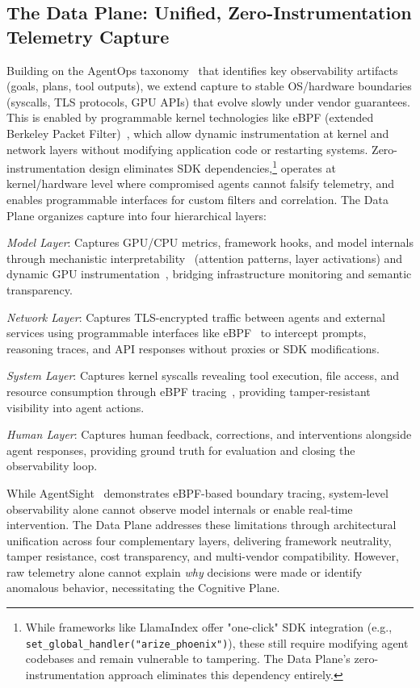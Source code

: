 \documentclass[sigplan,screen,9pt]{acmart}
\begin{document}
\subsection{The Data Plane: Unified, Zero-Instrumentation Telemetry Capture}

Building on the AgentOps taxonomy~\cite{Dong2024AgentOps} that identifies key observability artifacts (goals, plans, tool outputs), we extend capture to stable OS/hardware boundaries (syscalls, TLS protocols, GPU APIs) that evolve slowly under vendor guarantees. This is enabled by programmable kernel technologies like eBPF (extended Berkeley Packet Filter)~\cite{brendangregg,ebpfio}, which allow dynamic instrumentation at kernel and network layers without modifying application code or restarting systems. Zero-instrumentation design eliminates SDK dependencies,\footnote{While frameworks like LlamaIndex offer "one-click" SDK integration (e.g., \texttt{set\_global\_handler("arize\_phoenix")}), these still require modifying agent codebases and remain vulnerable to tampering. The Data Plane's zero-instrumentation approach eliminates this dependency entirely.} operates at kernel/hardware level where compromised agents cannot falsify telemetry, and enables programmable interfaces for custom filters and correlation. The Data Plane organizes capture into four hierarchical layers:

\emph{Model Layer}: Captures GPU/CPU metrics, framework hooks, and model internals through mechanistic interpretability~\cite{Kim2025AgenticInterp} (attention patterns, layer activations) and dynamic GPU instrumentation~\cite{yang2025egpu}, bridging infrastructure monitoring and semantic transparency.

\emph{Network Layer}: Captures TLS-encrypted traffic between agents and external services using programmable interfaces like eBPF~\cite{zheng2025extending} to intercept prompts, reasoning traces, and API responses without proxies or SDK modifications.

\emph{System Layer}: Captures kernel syscalls revealing tool execution, file access, and resource consumption through eBPF tracing~\cite{brendangregg,ebpfio}, providing tamper-resistant visibility into agent actions.

\emph{Human Layer}: Captures human feedback, corrections, and interventions alongside agent responses, providing ground truth for evaluation and closing the observability loop.

While AgentSight~\cite{zheng2025agentsight} demonstrates eBPF-based boundary tracing, system-level observability alone cannot observe model internals or enable real-time intervention. The Data Plane addresses these limitations through architectural unification across four complementary layers, delivering framework neutrality, tamper resistance, cost transparency, and multi-vendor compatibility. However, raw telemetry alone cannot explain \emph{why} decisions were made or identify anomalous behavior, necessitating the Cognitive Plane.
\end{document}
